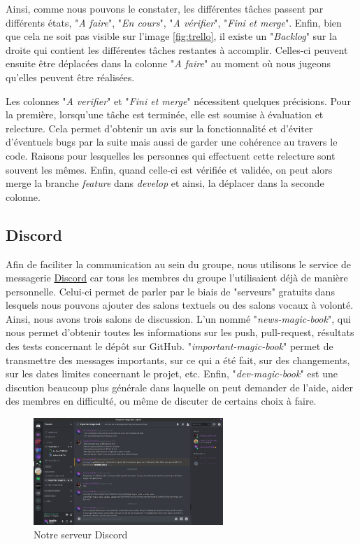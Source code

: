 			Ainsi, comme nous pouvons le constater, les différentes tâches passent par différents états, "\textit{A faire}", "\textit{En cours}", "\textit{A vérifier}", "\textit{Fini et merge}". Enfin, bien que cela ne soit pas visible sur l'image \ref{fig:trello}, il existe un "\textit{Backlog}" sur la droite qui contient les différentes tâches restantes à accomplir. Celles-ci peuvent ensuite être déplacées dans la colonne "\textit{A faire}" au moment où nous jugeons qu'elles peuvent être réalisées.

			Les colonnes "\textit{A verifier}" et "\textit{Fini et merge}" nécessitent quelques précisions. Pour la première, lorsqu'une tâche est terminée, elle est soumise à évaluation et relecture. Cela permet d'obtenir un avis sur la fonctionnalité et d'éviter d'éventuels bugs par la suite mais aussi de garder une cohérence au travers le code. Raisons pour lesquelles les personnes qui effectuent cette relecture sont souvent les mêmes. Enfin, quand celle-ci est vérifiée et validée, on peut alors merge la branche \textit{feature} dans \textit{develop} et ainsi, la déplacer dans la seconde colonne.

		\subsection{Discord}

			Afin de faciliter la communication au sein du groupe, nous utilisons le service de messagerie \href{https://discordapp.com}{Discord} car tous les membres du groupe l'utilisaient déjà de manière personnelle. Celui-ci permet de parler par le biais de "serveurs" gratuits dans lesquels nous pouvons ajouter des salons textuels ou des salons vocaux à volonté. Ainsi, nous avons trois salons de discussion. L'un nommé "\textit{news-magic-book}", qui nous permet d'obtenir toutes les informations sur les push, pull-request, résultats des tests concernant le dépôt sur GitHub. "\textit{important-magic-book}" permet de transmettre des messages importants, sur ce qui a été fait, sur des changements, sur les dates limites concernant le projet, etc. Enfin, "\textit{dev-magic-book}" est une discution beaucoup plus générale dans laquelle on peut demander de l'aide, aider des membres en difficulté, ou même de discuter de certains choix à faire.

			\begin{figure}[H]
				\centering\includegraphics[width=0.64\textwidth, keepaspectratio]{img/discord.png}
				\caption{Notre serveur Discord}
			\end{figure}
